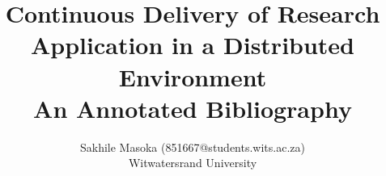 \documentclass [11pt]{article}
\title{Continuous Delivery of Research Application in a Distributed Environment \\\medskip An Annotated Bibliography}
\author{Sakhile Masoka (851667@students.wits.ac.za)\\Witwatersrand University}
\begin{document}
\maketitle
\nocite{*}

\end{document}
